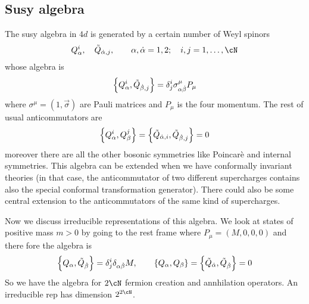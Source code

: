 \documentclass[11pt]{article}
\theoremstyle{definition}
\numberwithin{equation}{section}
\begin{document}
\subsection{Susy algebra}
The susy algebra in $4d$ is generated by a certain number of Weyl spinors 
\begin{equation}
	Q_{\alpha}^{i},\quad\Tilde{Q}_{\dot\alpha, j},\qquad \alpha,\dot\alpha=1,2;\quad i,j=1,\ldots,\cN
\end{equation}
whose algebra is 
\begin{equation}
	\acomm{Q_{\alpha}^{i}}{\tilde{Q}_{\dot\beta,j}}=\delta^{i}_{j}\sigma^{\mu}_{\alpha\dot\beta}P_{\mu}
\end{equation}
where $\sigma^{\mu}=(1,\vec{\sigma})$ are Pauli matrices and $P_{\mu}$ is the four momentum. The rest of usual anticommutators are
\begin{equation}
	\acomm{Q_{\alpha}^{i}}{Q_{\beta}^{j}}=\acomm{\tilde{Q}_{\dot\alpha,i}}{\tilde{Q}_{\dot\beta,j}}=0
\end{equation}
moreover there are all the other bosonic symmetries like Poincarè and internal symmetries. This algebra can be extended when we have conformally invariant theories (in that case, the anticommutator of two different supercharges contains also the special conformal transformation generator). There could also be some central extension to the anticommutators of the same kind of supercharges.

Now we discuss irreducible representations of this algebra. We look at states of positive mass $m>0$ by going to the rest frame where $P_{\mu}=(M,0,0,0)$ and there fore the algebra is
\begin{equation}
	\acomm{Q_{\alpha}}{\tilde{Q}_{\dot\beta}}=\delta^{i}_{j}\delta_{\alpha\dot\beta}M,\qquad \acomm{Q_{\alpha}}{Q_{\beta}}=\acomm{\tilde{Q}_{\dot\alpha}}{\tilde{Q}_{\dot\beta}}=0
\end{equation}
So we have the algebra for $2\cN$ fermion creation and annhilation operators. An irreducible rep has dimension $2^{2\cN}$.
\end{document}
